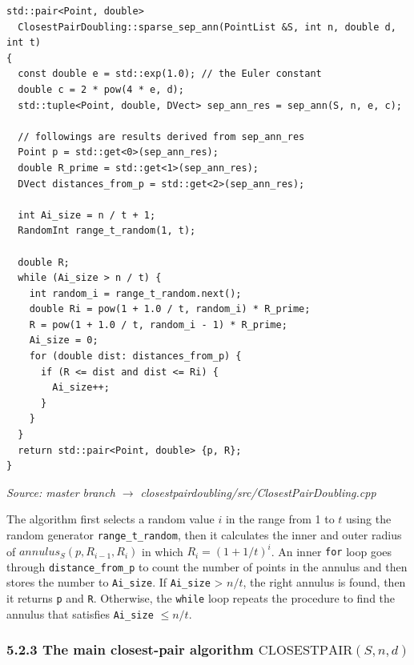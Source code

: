 \documentclass[12pt,english,]{article}
\newcommand{\code}[1]{\colorbox{lbcolor}{\texttt{#1}}}
\newcommand{\pnt}[1]{{\scriptstyle#1}}
\begin{document}
\begin{lstlisting}
std::pair<Point, double>
  ClosestPairDoubling::sparse_sep_ann(PointList &S, int n, double d, int t)
{
  const double e = std::exp(1.0); // the Euler constant
  double c = 2 * pow(4 * e, d);
  std::tuple<Point, double, DVect> sep_ann_res = sep_ann(S, n, e, c);

  // followings are results derived from sep_ann_res
  Point p = std::get<0>(sep_ann_res);
  double R_prime = std::get<1>(sep_ann_res);
  DVect distances_from_p = std::get<2>(sep_ann_res);

  int Ai_size = n / t + 1;
  RandomInt range_t_random(1, t);

  double R;
  while (Ai_size > n / t) {
    int random_i = range_t_random.next();
    double Ri = pow(1 + 1.0 / t, random_i) * R_prime;
    R = pow(1 + 1.0 / t, random_i - 1) * R_prime;
    Ai_size = 0;
    for (double dist: distances_from_p) {
      if (R <= dist and dist <= Ri) {
        Ai_size++;
      }
    }
  }
  return std::pair<Point, double> {p, R};
}
\end{lstlisting}
\vspace{-2truemm}
\begin{minipage}{1\textwidth}
  \begin{flushright}
  {\footnotesize \emph{Source: master branch $\rightarrow$ closestpairdoubling/src/ClosestPairDoubling.cpp}\par}
  \end{flushright}
\end{minipage}
\vspace{0.5truemm}

The algorithm first selects a random value \(i\) in the range from 1 to
\(t\) using the random generator \code{range\_t\_random}, then it
calculates the inner and outer radius of \(annulus_S(p, R_{i-1}, R_i)\)
in which \(R_i = (1+1/t)^i\). An inner \code{for} loop goes through
\code{distance\_from\_p} to count the number of points in the annulus
and then stores the number to \code{Ai\_size}. If \code{Ai\_size}
\textgreater{} \(n/t\), the right annulus is found, then it returns
\code{p} and \code{R}. Otherwise, the \code{while} loop repeats the
procedure to find the annulus that satisfies \code{Ai\_size}
\(\leq n/t\).

\hypertarget{section5.2.3}{%
\subsubsection{\texorpdfstring{5.2.3 The main closest-pair algorithm
\(\mathrm{C\pnt{LOSEST}P\pnt{AIR}}(S,n,d)\)}{5.2.3 The main closest-pair algorithm \textbackslash{}mathrm\{C\textbackslash{}pnt\{LOSEST\}P\textbackslash{}pnt\{AIR\}\}(S,n,d)}}\label{section5.2.3}}
\end{document}
